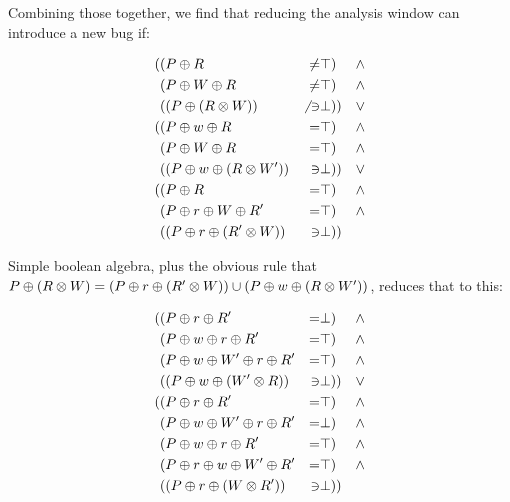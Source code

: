 Combining those together, we find that reducing the analysis window can introduce a new bug if:

\begin{align*}
( & (P \oplus R & \not= & \top) & \wedge \\
  & (P \oplus W \oplus R & \not= & \top) & \wedge \\
  & ((P \oplus (R \otimes W)) & \not{}\ni & \bot)) & \vee \\
( & (P \oplus w \oplus R & = & \top) & \wedge \\
  & (P \oplus W \oplus R & = & \top) & \wedge \\
  & ((P \oplus w \oplus (R \otimes W')) & \ni & \bot)) & \vee \\
( & (P \oplus R & = & \top) & \wedge \\
  & (P \oplus r \oplus W \oplus R' & = & \top) & \wedge \\
  & ((P \oplus r \oplus (R' \otimes W)) & \ni & \bot))
\end{align*}

Simple boolean algebra, plus the obvious rule that $P \oplus (R \otimes W) = (P \oplus r \oplus (R' \otimes W) ) \cup (P \oplus w \oplus (R \otimes W') ) $, reduces that to this:

\begin{align*}
( & (P \oplus r \oplus R' & = & \bot) & \wedge \\
  & (P \oplus w \oplus r \oplus R' & = & \top) & \wedge \\
  & (P \oplus w \oplus W' \oplus r \oplus R' & = & \top) & \wedge \\
  & ((P \oplus w \oplus (W' \otimes R)) & \ni & \bot)) & \vee \\
( & (P \oplus r \oplus R' & = & \top) & \wedge \\
  & (P \oplus w \oplus W' \oplus r \oplus R' & = & \bot) & \wedge \\
  & (P \oplus w \oplus r \oplus R' & = & \top) & \wedge \\
  & (P \oplus r \oplus w \oplus W' \oplus R' & = & \top) & \wedge \\
  & ((P \oplus r \oplus (W \otimes R')) & \ni & \bot))
\end{align*}

